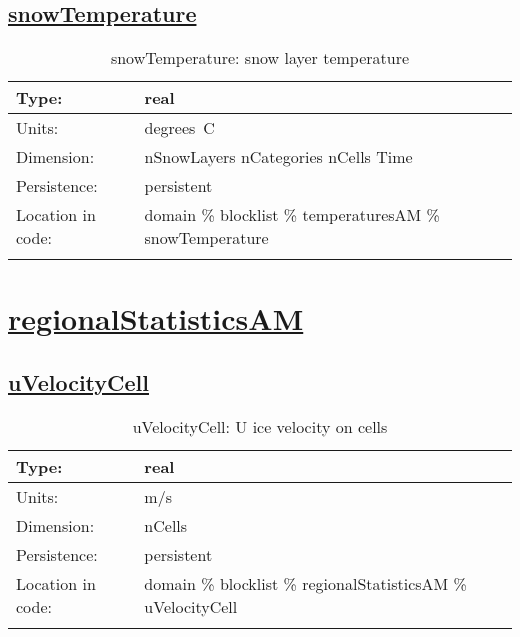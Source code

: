 \subsection[snowTemperature]{\hyperref[sec:var_tab_temperaturesAM]{snowTemperature}}
\label{subsec:var_sec_temperaturesAM_snowTemperature}
\begin{center}
\begin{longtable}{| p{2.0in} | p{4.0in} |}
        \hline 
        Type: & real \\
        \hline 
        Units: & \si{degrees.C} \\
        \hline 
        Dimension: & nSnowLayers nCategories nCells Time \\
        \hline 
        Persistence: & persistent \\
        \hline 
         Location in code: & domain \% blocklist \% temperaturesAM \% snowTemperature \\
         \hline 
    \caption{snowTemperature: snow layer temperature}
\end{longtable}
\end{center}
\section[regionalStatisticsAM]{\hyperref[sec:var_tab_regionalStatisticsAM]{regionalStatisticsAM}}
\label{sec:var_sec_regionalStatisticsAM}
\subsection[uVelocityCell]{\hyperref[sec:var_tab_regionalStatisticsAM]{uVelocityCell}}
\label{subsec:var_sec_regionalStatisticsAM_uVelocityCell}
\begin{center}
\begin{longtable}{| p{2.0in} | p{4.0in} |}
        \hline 
        Type: & real \\
        \hline 
        Units: & \si{m/s} \\
        \hline 
        Dimension: & nCells \\
        \hline 
        Persistence: & persistent \\
        \hline 
         Location in code: & domain \% blocklist \% regionalStatisticsAM \% uVelocityCell \\
         \hline 
    \caption{uVelocityCell: U ice velocity on cells}
\end{longtable}
\end{center}
